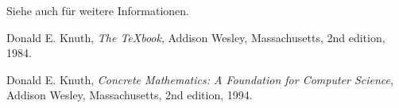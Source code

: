 \documentclass[12pt,ngerman,parskip=half]{scrartcl}
\begin{document}
\blindtext Siehe auch \cite{texbook} für weitere Informationen.




\begin{thebibliography}{9}

  Donald E. Knuth,
  \textit{The \TeX book},
  Addison Wesley, Massachusetts,
  2nd edition,
  1984.

  Donald E. Knuth,
  \textit{Concrete Mathematics: A Foundation for Computer Science},
  Addison Wesley, Massachusetts,
  2nd edition,
  1994.
  

\end{thebibliography}
\end{document}
